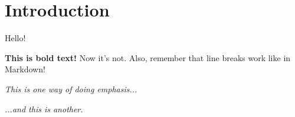 \section{Introduction}

Hello!

{\bf This is bold text!} Now it's not.
Also, remember that line breaks work like in Markdown!

\emph{This is one way of doing emphasis...}

{\em ...and this is another.}
